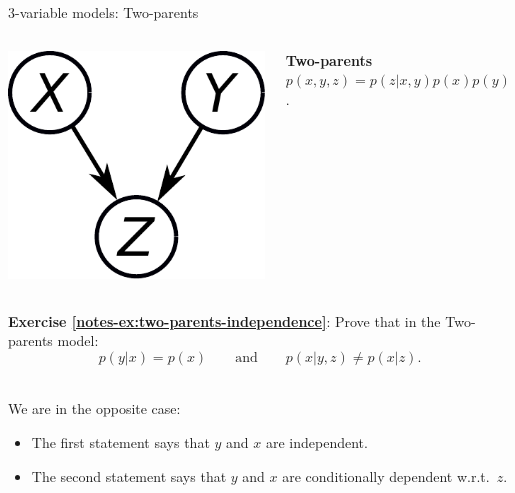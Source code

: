\documentclass{beamer}
\newcommand{\exercise}[2]{\noindent\colorbox{blue!10}{\parbox{0.995\textwidth}{\textbf{Exercise \ref{notes-ex:#1}}: #2}}\\}
\begin{document}
\begin{frame}{3-variable models: Two-parents}
\begin{columns}
  \begin{column}{0.12\textwidth}%
   \includegraphics[width=1.2\textwidth]{fig/twoparents-xyz.pdf}
  \end{column}%
  \begin{column}{0.8\textwidth}
  \textbf{Two-parents}\;\; $p(x,y,z) = p(z|x,y)p(x)p(y)$.
  \end{column}
 \end{columns}
 \vspace{4mm}
\exercise{two-parents-independence}{Prove that in the Two-parents model:
\begin{equation}
 p(y|x) = p(x) \qquad \text{and} \qquad p(x|y,z) \neq p(x|z).
\end{equation}}\vspace{2mm}
We are in the opposite case:
\begin{itemize}
 \item The first statement says that $y$ and $x$ are independent.
 \item The second statement says that $y$ and $x$ are conditionally dependent w.r.t.\ $z$.
\end{itemize}
\end{frame}
\end{document}
